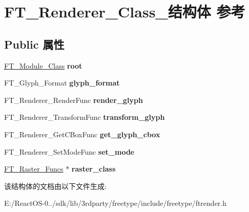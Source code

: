 \hypertarget{struct_f_t___renderer___class__}{}\section{F\+T\+\_\+\+Renderer\+\_\+\+Class\+\_\+结构体 参考}
\label{struct_f_t___renderer___class__}
\subsection*{Public 属性}
\begin{DoxyCompactItemize}
\item 
\mbox{\label{struct_f_t___renderer___class___a3df4509f1de704596bf4237d6ff8cbd4}} 
\hyperlink{struct_f_t___module___class__}{F\+T\+\_\+\+Module\+\_\+\+Class} {\bfseries root}
\item 
\mbox{\label{struct_f_t___renderer___class___a2c8602452fae27379a6f85bbcb4b525c}} 
F\+T\+\_\+\+Glyph\+\_\+\+Format {\bfseries glyph\+\_\+format}
\item 
\mbox{\label{struct_f_t___renderer___class___a7a022b8358ce3a06620c62f3542d0d2b}} 
F\+T\+\_\+\+Renderer\+\_\+\+Render\+Func {\bfseries render\+\_\+glyph}
\item 
\mbox{\label{struct_f_t___renderer___class___a2aef09ecdabacf5628ef29fb3d179def}} 
F\+T\+\_\+\+Renderer\+\_\+\+Transform\+Func {\bfseries transform\+\_\+glyph}
\item 
\mbox{\label{struct_f_t___renderer___class___a4f9dc9b6d86504a8d3b04b4e72936e76}} 
F\+T\+\_\+\+Renderer\+\_\+\+Get\+C\+Box\+Func {\bfseries get\+\_\+glyph\+\_\+cbox}
\item 
\mbox{\label{struct_f_t___renderer___class___a7cfd4795107157aad4f7efcab77a0f64}} 
F\+T\+\_\+\+Renderer\+\_\+\+Set\+Mode\+Func {\bfseries set\+\_\+mode}
\item 
\mbox{\label{struct_f_t___renderer___class___a5af75b9f582f98f9f74dbcbc530c7e88}} 
\hyperlink{struct_f_t___raster___funcs__}{F\+T\+\_\+\+Raster\+\_\+\+Funcs} $\ast$ {\bfseries raster\+\_\+class}
\end{DoxyCompactItemize}


该结构体的文档由以下文件生成\+:\begin{DoxyCompactItemize}
\item 
E\+:/\+React\+O\+S-\/0../sdk/lib/3rdparty/freetype/include/freetype/ftrender.\+h\end{DoxyCompactItemize}
